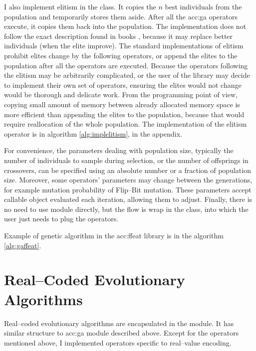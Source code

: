 I also implement elitism in the  class. It copies the $n$ best individuals from the population and temporarily stores them aside. After all the \acrshort{acc:ga} operators execute, it copies them back into the population. The implementation does not follow the exact description found in books \citep{IntroductionToEA}, because it may replace better individuals (when the elite improve). The standard implementations of elitism prohibit elites change by the following operators, or append the elites to the population after all the operators are executed. 
Because the operators following the elitism may be arbitrarily complicated, or the user of the library may decide to implement their own set of operators, ensuring the elites would not change would be thorough and delicate work. %
From the \gpu programming point of view, copying small amount of memory between already allocated memory space is more efficient than appending the elites to the population, because that would require reallocation of the whole population. The implementation of the elitism operator is in algorithm \ref{alg:implelitism}, in the appendix.

For convenience, the parameters dealing with population size, typically the number of individuals to sample during selection, or the number of offsprings in crossovers, can be specified using an absolute number or a fraction of population size. Moreover, some operators' parameters may change between the generations, for example mutation probability of Flip--Bit mutation. These parameters accept callable object evaluated each iteration, allowing them to adjust. Finally, there is no need to use  module directly, but the flow is wrap in the  class, into which the user just needs to plug the operators.

Example of genetic algorithm in the \acrshort{acc:ffeat} library is in the algorithm \ref{alg:gaffeat}.



\section{Real--Coded Evolutionary Algorithms}

Real--coded evolutionary algorithms are encapsulated in the  module. It has similar structure to \acrshort{acc:ga} module described above. Except for the operators mentioned above, I implemented operators specific to real--value encoding.

